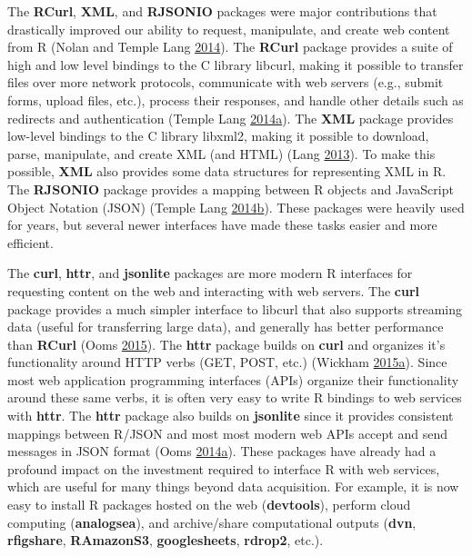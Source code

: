\documentclass[12pt,]{isuthesis}
\begin{document}
The \textbf{RCurl}, \textbf{XML}, and \textbf{RJSONIO} packages were
major contributions that drastically improved our ability to request,
manipulate, and create web content from R (Nolan and Temple Lang
\protect\hyperlink{ref-nolan-lang}{2014}). The \textbf{RCurl} package
provides a suite of high and low level bindings to the C library
libcurl, making it possible to transfer files over more network
protocols, communicate with web servers (e.g., submit forms, upload
files, etc.), process their responses, and handle other details such as
redirects and authentication (Temple Lang
\protect\hyperlink{ref-RCurl}{2014}\protect\hyperlink{ref-RCurl}{a}).
The \textbf{XML} package provides low-level bindings to the C library
libxml2, making it possible to download, parse, manipulate, and create
XML (and HTML) (Lang \protect\hyperlink{ref-XML}{2013}). To make this
possible, \textbf{XML} also provides some data structures for
representing XML in R. The \textbf{RJSONIO} package provides a mapping
between R objects and JavaScript Object Notation (JSON) (Temple Lang
\protect\hyperlink{ref-RJSONIO}{2014}\protect\hyperlink{ref-RJSONIO}{b}).
These packages were heavily used for years, but several newer interfaces
have made these tasks easier and more efficient.

The \textbf{curl}, \textbf{httr}, and \textbf{jsonlite} packages are
more modern R interfaces for requesting content on the web and
interacting with web servers. The \textbf{curl} package provides a much
simpler interface to libcurl that also supports streaming data (useful
for transferring large data), and generally has better performance than
\textbf{RCurl} (Ooms \protect\hyperlink{ref-curl}{2015}). The
\textbf{httr} package builds on \textbf{curl} and organizes it's
functionality around HTTP verbs (GET, POST, etc.) (Wickham
\protect\hyperlink{ref-httr}{2015}\protect\hyperlink{ref-httr}{a}).
Since most web application programming interfaces (APIs) organize their
functionality around these same verbs, it is often very easy to write R
bindings to web services with \textbf{httr}. The \textbf{httr} package
also builds on \textbf{jsonlite} since it provides consistent mappings
between R/JSON and most most modern web APIs accept and send messages in
JSON format (Ooms
\protect\hyperlink{ref-jsonlite}{2014}\protect\hyperlink{ref-jsonlite}{a}).
These packages have already had a profound impact on the investment
required to interface R with web services, which are useful for many
things beyond data acquisition. For example, it is now easy to install R
packages hosted on the web (\textbf{devtools}), perform cloud computing
(\textbf{analogsea}), and archive/share computational outputs
(\textbf{dvn}, \textbf{rfigshare}, \textbf{RAmazonS3},
\textbf{googlesheets}, \textbf{rdrop2}, etc.).
\end{document}
